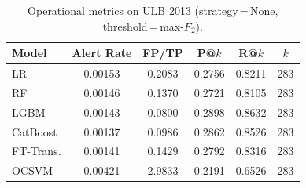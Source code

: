\begin{table}[ht!]
\centering
\caption{Operational metrics on ULB 2013 (strategy\,=\,None, threshold\,=\,max-$F_2$).}
\label{tab:ops_ulb}
\begin{tabular}{l c c c c c}
\toprule
Model & Alert Rate & FP/TP & P@$k$ & R@$k$ & $k$ \\
\midrule
LR         & 0.00153 & 0.2083 & 0.2756 & 0.8211 & 283 \\
RF         & 0.00146 & 0.1370 & 0.2721 & 0.8105 & 283 \\
LGBM       & 0.00143 & 0.0800 & 0.2898 & 0.8632 & 283 \\
CatBoost   & 0.00137 & 0.0986 & 0.2862 & 0.8526 & 283 \\
FT-Trans.  & 0.00141 & 0.1429 & 0.2792 & 0.8316 & 283 \\
OCSVM      & 0.00421 & 2.9833 & 0.2191 & 0.6526 & 283 \\
\bottomrule
\end{tabular}
\end{table}